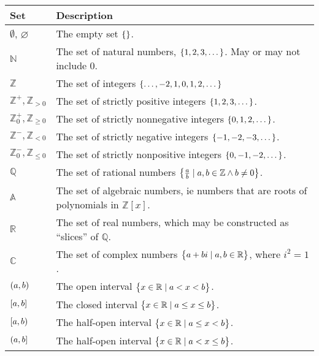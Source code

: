 \documentclass[fleqn,a4paper,11pt]{article}
\begin{document}
    \begin{longtable}{ll}
    \toprule
    \bfseries Set & \bfseries Description \\
    \midrule
    \endhead
    \(\emptyset\), \(\varnothing\) & The empty set \(\set{}\). \\
    \(\mathbb{N}\) & The set of natural numbers, \(\set{1, 2, 3, \dotsc}\).
                   May or may not include \(0\). \\
    \(\mathbb{Z}\) & The set of integers
                   \(\set{\dotsc, -2, 1, 0, 1, 2, \dotsc}\) \\
    \(\mathbb{Z}^+, \mathbb{Z}_{> 0}\) & The set of strictly positive integers
                   \(\set{1, 2, 3, \dotsc}\). \\
    \(\mathbb{Z}^+_0, \mathbb{Z}_{\ge 0}\) &
                   The set of strictly nonnegative integers
                   \(\set{0, 1, 2, \dotsc}\). \\
    \(\mathbb{Z}^-, \mathbb{Z}_{< 0}\) & The set of strictly negative integers
                   \(\set{-1, -2, -3, \dotsc}\). \\
    \(\mathbb{Z}^-_0, \mathbb{Z}_{\le 0}\) &
                   The set of strictly nonpositive integers
                   \(\set{0, -1, -2, \dotsc}\). \\
    \(\mathbb{Q}\) & The set of rational numbers
                   \(\set{\frac ab \mid a, b \in \mathbb{Z} \land b \neq 0}\).\\
    \(\mathbb{A}\) & The set of algebraic numbers, ie numbers that are roots of
                   polynomials in \(\mathbb Z[x]\). \\
    \(\mathbb{R}\) & The set of real numbers, which may be constructed as
                   ``slices'' of \(\mathbb{Q}\). \\
    \(\mathbb{C}\) & The set of complex numbers
                   \(\set{a + bi \mid a, b \in \mathbb{R}}\),
                   where \(i^2 = 1\).\\
    \(\intoo{a, b}\) & The open interval
                     \(\set{x \in \mathbb{R} \mid a < x < b}\).\\
    \(\intcc{a, b}\) & The closed interval
                     \(\set{x \in \mathbb{R} \mid a \le x \le b}\).\\
    \(\intco{a, b}\) & The half-open interval
                     \(\set{x \in \mathbb{R} \mid a \le x < b}\).\\
    \(\intoc{a, b}\) & The half-open interval
                     \(\set{x \in \mathbb{R} \mid a < x \le b}\).\\
    \bottomrule
    \end{longtable}
\end{document}
